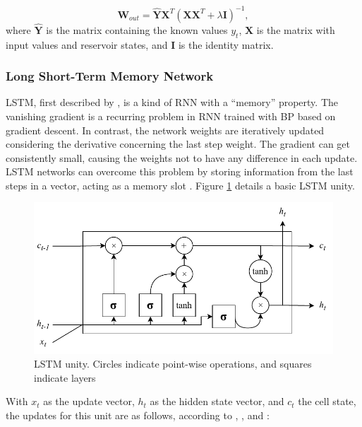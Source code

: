 \begin{equation}
    \mathbf{W}_{out} = \mathbf{\hat{Y}} \mathbf{X}^T \left( \mathbf{X} \mathbf{X}^T + \lambda \mathbf{I} \right)^{-1},
\end{equation}
where $\mathbf{\hat{Y}}$ is the matrix containing the known values $y_t$, $\mathbf{X}$ is the matrix with input values and reservoir states, and $\mathbf{I}$ is the identity matrix.

\subsubsection{Long Short-Term Memory Network}
\ac{LSTM}, first described by , is a kind of \ac{RNN} with a ``memory'' property. The vanishing gradient is a recurring problem in \ac{RNN} trained with \ac{BP} based on gradient descent. In contrast, the network weights are iteratively updated considering the derivative concerning the last step weight. The gradient can get consistently small, causing the weights not to have any difference in each update. \ac{LSTM} networks can overcome this problem by storing information from the last steps in a vector, acting as a memory slot \cite{aggarwal2018Neural}. Figure \ref{fig:lstm} details a basic \ac{LSTM} unity.

\begin{figure}[htb!]
    \centering
    \includegraphics[width=0.8\linewidth]{Media/lstm.pdf}
    \caption{LSTM unity. Circles indicate point-wise operations, and squares indicate layers}
    \label{fig:lstm}
\end{figure}

With $x_t$ as the update vector, $h_t$ as the hidden state vector, and $c_t$ the cell state, the updates for this unit are as follows, according to , , and :


